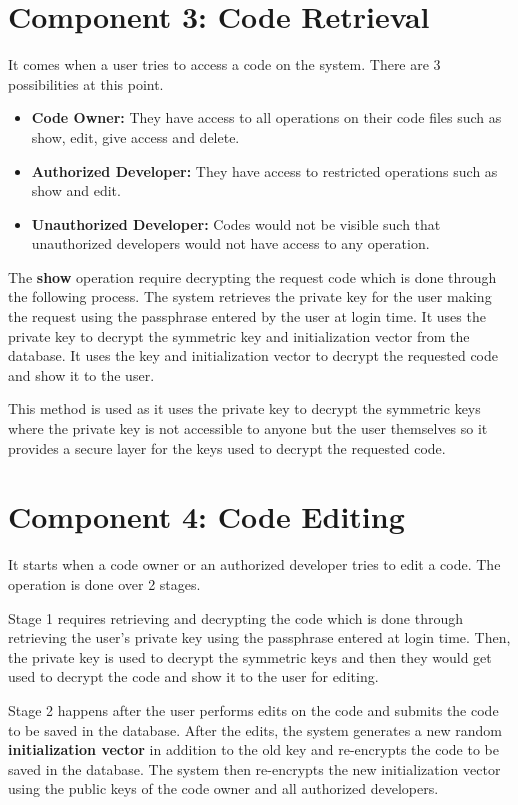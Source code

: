 \section{Component 3: Code Retrieval}
\label{sec:pgp_info_2}

It comes when a user tries to access a code on the system. There are 3 possibilities at this point.

\begin{itemize}
	\item \textbf{Code Owner:} They have access to all operations on their code files such as show, edit, give access and delete.
	\item \textbf{Authorized Developer:} They have access to restricted operations such as show and edit.
	\item \textbf{Unauthorized Developer:} Codes would not be visible such that unauthorized developers would not have access to any operation.
\end{itemize}

The \textbf{show} operation require decrypting the request code which is done through the following process. The system retrieves the private key for the user making the request using the passphrase entered by the user at login time. It uses the private key to decrypt the symmetric key and initialization vector from the database. It uses the key and initialization vector to decrypt the requested code and show it to the user.

This method is used as it uses the private key to decrypt the symmetric keys where the private key is not accessible to anyone but the user themselves so it provides a secure layer for the keys used to decrypt the requested code.

\section{Component 4: Code Editing}

It starts when a code owner or an authorized developer tries to edit a code. The operation is done over 2 stages.

Stage 1 requires retrieving and decrypting the code which is done through retrieving the user's private key using the passphrase entered at login time. Then, the private key is used to decrypt the symmetric keys and then they would get used to decrypt the code and show it to the user for editing.

Stage 2 happens after the user performs edits on the code and submits the code to be saved in the database. After the edits, the system generates a new random \textbf{initialization vector} in addition to the old key and re-encrypts the code to be saved in the database. The system then re-encrypts the new initialization vector using the public keys of the code owner and all authorized developers.

